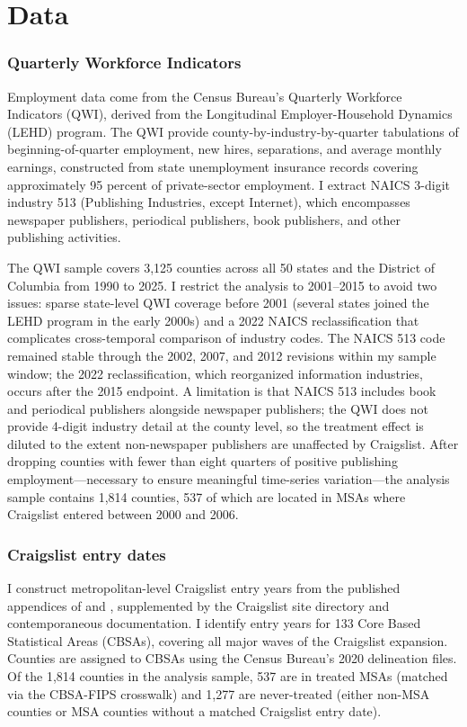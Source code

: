 \documentclass[12pt]{article}
\begin{document}
\section{Data}

\subsubsection*{Quarterly Workforce Indicators} Employment data come from the Census Bureau's Quarterly Workforce Indicators (QWI), derived from the Longitudinal Employer-Household Dynamics (LEHD) program. The QWI provide county-by-industry-by-quarter tabulations of beginning-of-quarter employment, new hires, separations, and average monthly earnings, constructed from state unemployment insurance records covering approximately 95 percent of private-sector employment. I extract NAICS 3-digit industry 513 (Publishing Industries, except Internet), which encompasses newspaper publishers, periodical publishers, book publishers, and other publishing activities.

The QWI sample covers 3,125 counties across all 50 states and the District of Columbia from 1990 to 2025. I restrict the analysis to 2001--2015 to avoid two issues: sparse state-level QWI coverage before 2001 (several states joined the LEHD program in the early 2000s) and a 2022 NAICS reclassification that complicates cross-temporal comparison of industry codes. The NAICS 513 code remained stable through the 2002, 2007, and 2012 revisions within my sample window; the 2022 reclassification, which reorganized information industries, occurs after the 2015 endpoint. A limitation is that NAICS 513 includes book and periodical publishers alongside newspaper publishers; the QWI does not provide 4-digit industry detail at the county level, so the treatment effect is diluted to the extent non-newspaper publishers are unaffected by Craigslist. After dropping counties with fewer than eight quarters of positive publishing employment---necessary to ensure meaningful time-series variation---the analysis sample contains 1,814 counties, 537 of which are located in MSAs where Craigslist entered between 2000 and 2006.

\subsubsection*{Craigslist entry dates} I construct metropolitan-level Craigslist entry years from the published appendices of \citet{kroft_pope_2014} and \citet{seamans_zhu_2014}, supplemented by the Craigslist site directory and contemporaneous documentation. I identify entry years for 133 Core Based Statistical Areas (CBSAs), covering all major waves of the Craigslist expansion. Counties are assigned to CBSAs using the Census Bureau's 2020 delineation files. Of the 1,814 counties in the analysis sample, 537 are in treated MSAs (matched via the CBSA-FIPS crosswalk) and 1,277 are never-treated (either non-MSA counties or MSA counties without a matched Craigslist entry date).
\end{document}
